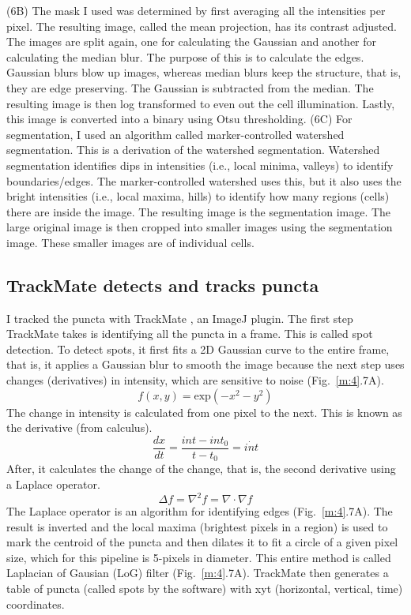 \begin{centering}
{(6B) The mask I used was determined by first averaging all the intensities per pixel. The resulting image, called the mean projection, has its contrast adjusted. The images are split again, one for calculating the Gaussian and another for calculating the median blur. The purpose of this is to calculate the edges. Gaussian blurs blow up images, whereas median blurs keep the structure, that is, they are edge preserving. The Gaussian is subtracted from the median. The resulting image is then log transformed to even out the cell illumination. Lastly, this image is converted into a binary using Otsu thresholding. (6C) For segmentation, I used an algorithm called marker-controlled watershed segmentation. This is a derivation of the watershed segmentation. Watershed segmentation identifies dips in intensities (i.e., local minima, valleys) to identify boundaries/edges. The marker-controlled watershed uses this, but it also uses the bright intensities (i.e., local maxima, hills) to identify how many regions (cells) there are inside the image. The resulting image is the segmentation image. The large original image is then cropped into smaller images using the segmentation image. These smaller images are of individual cells.}
\label{m:3}
\end{centering}

\subsection{TrackMate detects and tracks puncta}
I tracked the puncta with TrackMate \autocite{Tinevez_2017}, an ImageJ plugin. The first step TrackMate takes is identifying all the puncta in a frame. This is called spot detection. To detect spots, it first fits a 2D Gaussian curve to the entire frame, that is, it applies a Gaussian blur to smooth the image because the next step uses changes (derivatives) in intensity, which are sensitive to noise (Fig.~\ref{m:4}.7A).
\begin{equation*}
f(x,y) =\text{exp}(-x^2 - y^2)
\end{equation*}
The change in intensity is calculated from one pixel to the next. This is known as the derivative (from calculus). \begin{equation*}\frac{dx}{dt} = \frac{int - int_0}{t - t_0} = \dot{int}\end{equation*} After, it calculates the change of the change, that is, the second derivative using a Laplace operator. \begin{equation*}\Delta f = \nabla^2 f = \nabla \cdot \nabla f\end{equation*} The Laplace operator is an algorithm for identifying edges (Fig.~\ref{m:4}.7A). The result is inverted and the local maxima (brightest pixels in a region) is used to mark the centroid of the puncta and then dilates it to fit a circle of a given pixel size, which for this pipeline is 5-pixels in diameter. This entire method is called Laplacian of Gausian (LoG) filter (Fig.~\ref{m:4}.7A). TrackMate then generates a table of puncta (called spots by the software) with xyt (horizontal, vertical, time) coordinates.

